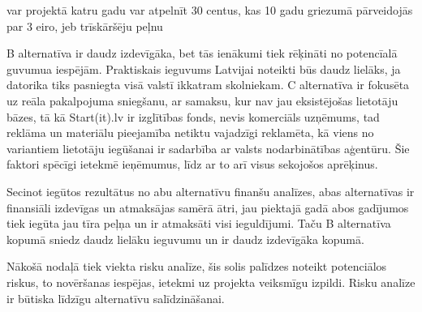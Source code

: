 var projektā katru gadu var atpelnīt 30 centus, kas 10 gadu griezumā pārveidojās par 3 eiro, jeb trīskāršēju peļnu
\par
B alternatīva ir daudz izdevīgāka, bet tās ienākumi tiek rēķināti no potencīalā guvumua iespējām. Praktiskais
ieguvums Latvijai noteikti būs daudz lielāks, ja datorika tiks pasniegta visā valstī ikkatram skolniekam.
C alternatīva ir fokusēta uz reāla pakalpojuma sniegšanu, ar samaksu, kur nav jau eksistējošas lietotāju bāzes,
tā kā Start(it).lv ir izglītības fonds, nevis komerciāls uzņēmums, tad reklāma un materiālu pieejamība netiktu
vajadzīgi reklamēta, kā viens no variantiem lietotāju iegūšanai ir sadarbība ar valsts nodarbinātības aģentūru.
Šie faktori spēcīgi ietekmē ieņēmumus, līdz ar to arī visus sekojošos aprēķinus.
\par
Secinot iegūtos rezultātus no abu alternatīvu finanšu analīzes, abas alternatīvas ir finansiāli izdevīgas un
atmaksājas samērā ātri, jau piektajā gadā abos gadījumos tiek iegūta jau tīra peļņa un ir atmaksāti visi 
ieguldījumi. Taču B alternatīva kopumā sniedz daudz lielāku ieguvumu un ir daudz izdevīgāka kopumā.
\par
Nākošā nodaļā tiek viekta risku analīze, šis solis palīdzes noteikt potenciālos riskus, to novēršanas iespējas,
ietekmi uz projekta veiksmīgu izpildi. Risku analīze ir būtiska līdzīgu alternatīvu salīdzināšanai.
